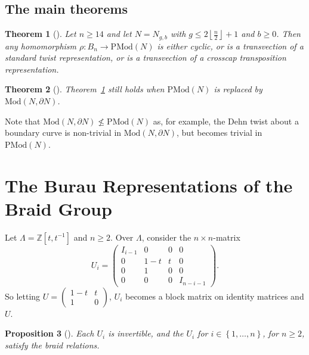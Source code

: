 \documentclass[reqno]{amsart}
\newtheorem{theorem}{Theorem}[section]
\newtheorem{proposition}[theorem]{Proposition}
\theoremstyle{definition}
\theoremstyle{remark}
\newcommand{\Mod}{{\mathrm{Mod}}}
\newcommand{\PMod}{{\mathrm{PMod}}}
\begin{document}
\subsection{The main theorems}

\begin{theorem}[]\label{Thm1.2}
    Let $n \ge 14$ and let $N = N_{g,b}$ with
    $g \le 2 \left\lfloor \frac{n}{2} \right\rfloor +1$ and
    $b\ge 0$. Then any homomorphism
    $\rho \colon B_n \to \PMod (N)$ is either
    cyclic, or is a transvection of a standard twist
    representation, or is a transvection of a crosscap
    transposition representation.
\end{theorem}

\begin{theorem}[]\label{Thm1.3}
    Theorem~\ref{Thm1.2} still holds
    when $\PMod (N)$ is replaced by $\Mod \left( N,
    \partial N \right) $.
\end{theorem}

Note that $\Mod (N, \partial N) \not \le 
\PMod (N)$ as, for example, the Dehn twist about a boundary
curve is non-trivial in $\Mod \left( N, \partial N \right) $, but
becomes trivial in $\PMod (N)$.



\newpage


\section{The Burau Representations of the Braid Group}

Let $\Lambda = \mathbb{Z} \left[ t,t^{-1} \right] $ and
$n \ge 2$. Over $\Lambda$, consider the $n\times n$-matrix
\[
U_i =
\begin{pmatrix} 
    I_{i-1} & 0 & 0 & 0\\
    0 & 1-t & t & 0\\
    0 & 1 & 0 & 0\\
    0 & 0 & 0 & I_{n-i-1}
\end{pmatrix}.
\] 
So letting
$U = \begin{pmatrix} 1- t & t \\ 1 & 0 \end{pmatrix} $,
$U_i$ becomes a block matrix on identity matrices and $U$.

\begin{proposition}[]
    Each $U_i$ is invertible, and the $U_i$ for $i \in 
    \left\{ 1, \ldots, n \right\} $, for $n\ge 2$, satisfy
    the braid relations.
\end{proposition}
\end{document}
